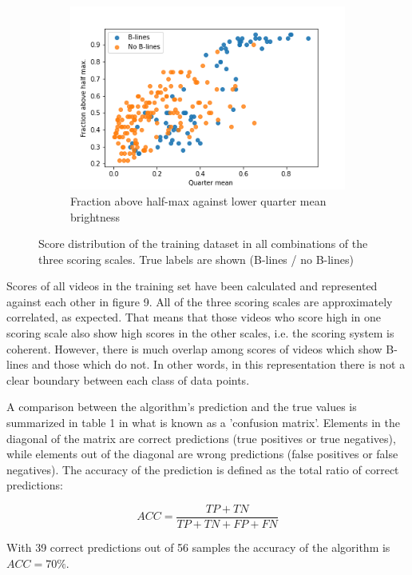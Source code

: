 \documentclass[12pt]{article} %
\begin{document}
\begin{figure}
		\begin{subfigure}{0.65\textwidth}
		\centering
		\includegraphics[width=\textwidth]{figuras/scores2_3.png}
		\caption{Fraction above half-max against lower quarter mean brightness}
		\end{subfigure}
	
	\caption{Score distribution of the training dataset in all combinations of the 	three scoring scales. True labels are shown (B-lines / no B-lines)}
	\end{figure}

	Scores of all videos in the training set have been calculated and represented  against each other in figure 9. All of the three scoring scales are approximately correlated, as expected. That means that those videos who score high in one scoring scale also show high scores in the other scales, i.e. the scoring system is coherent. However, there is much overlap among scores of videos which show B-lines and those which do not. In other words, in this representation there is not a clear boundary between each class of data points. 
	
	A comparison between the algorithm's prediction and the true values is summarized in table 1 in what is known as a 'confusion matrix'. Elements in the diagonal of the matrix are correct predictions (true positives or true negatives), while elements out of the diagonal are wrong predictions (false positives or false negatives).  The accuracy of the prediction is defined as the total ratio of correct predictions: 
	
	\[ ACC = \frac{TP + TN}{TP + TN + FP + FN}	\]
	
	With 39 correct predictions out of 56 samples the accuracy of the algorithm is $ACC = 70 \%$. 
	
\end{document}
